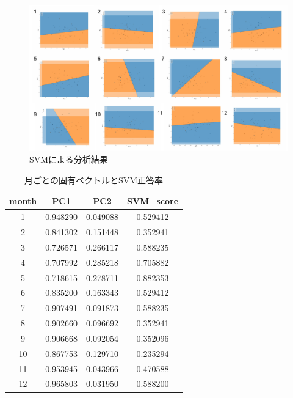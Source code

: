 \documentclass{jarticle}
\begin{document}
\begin{figure}[H]
\centering
\includegraphics[keepaspectratio, scale=0.75]
{svm_plot.pdf}
\caption{SVMによる分析結果}
\label{svm}
\end{figure}

\begin{table}[H]
\caption{月ごとの固有ベクトルとSVM正答率}
\begin{tabular}{|c|c|c|c|} \hline
month&PC1&PC2 &SVM\_score\\ \hline
 1&0.948290&0.049088&0.529412\\ \hline
 2&0.841302&0.151448&0.352941\\ \hline
 3&0.726571&0.266117&0.588235\\ \hline
 4&0.707992 &0.285218&0.705882\\ \hline
 5&0.718615&0.278711&0.882353\\ \hline
 6&0.835200&0.163343&0.529412\\ \hline
 7&0.907491&0.091873&0.588235\\ \hline
 8&0.902660&0.096692&0.352941\\ \hline
 9&0.906668&0.092054&0.352096\\ \hline
 10&0.867753&0.129710&0.235294\\ \hline
 11&0.953945&0.043966&0.470588\\ \hline
 12&0.965803&0.031950&0.588200\\ \hline
\end{tabular}
\centering
\label{score}
\end{table}
\end{document}
